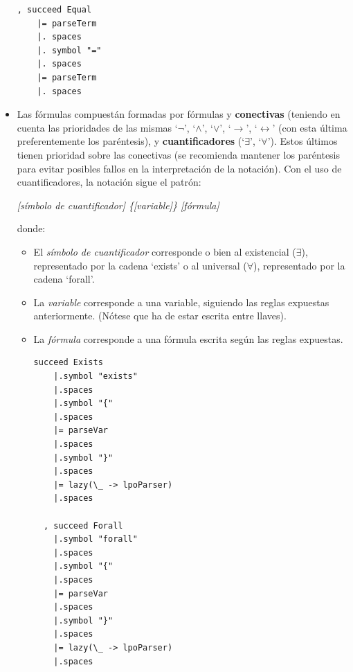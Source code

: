 \documentclass[a4paper]{report}
\begin{document}
\begin{itemize}
\begin{lstlisting}[caption={ParserLPO. Definición de Predicado de Igualdad.}, mathescape=true]
, succeed Equal
    |= parseTerm
    |. spaces
    |. symbol "="
    |. spaces
    |= parseTerm
    |. spaces 
\end{lstlisting}

\item Las fórmulas compuestán formadas por fórmulas y \textbf{conectivas} (teniendo en cuenta las prioridades de las mismas `$\neg$', `$\wedge$', `$\vee$', `$\rightarrow$', `$\leftrightarrow$' (con esta última preferentemente los paréntesis), y \textbf{cuantificadores} (`$\exists$', `$\forall$'). Estos últimos tienen prioridad sobre las conectivas (se recomienda mantener los paréntesis para evitar posibles fallos en la interpretación de la notación). Con el uso de cuantificadores, la notación sigue el patrón:

\begin{center}
\textit{[símbolo de cuantificador] \{[variable]\} [fórmula]}\\
\end{center}

donde:
\begin{itemize}
\item El \textit{símbolo de cuantificador} corresponde o bien al existencial ($\exists$), representado por la cadena `exists' o al universal ($\forall$), representado por la cadena `forall'.

\item La \textit{variable} corresponde a una variable, siguiendo las reglas expuestas anteriormente. (Nótese que ha de estar escrita entre llaves).

\item La \textit{fórmula} corresponde a una fórmula escrita según las reglas expuestas.\\

\begin{lstlisting}[caption={ParserLPO. Definición de Fórmulas con cuantificadores.}, mathescape=true]
succeed Exists
    |.symbol "exists"
    |.spaces
    |.symbol "{"
    |.spaces
    |= parseVar
    |.spaces
    |.symbol "}"
    |.spaces
    |= lazy(\_ -> lpoParser)
    |.spaces
  
  , succeed Forall
    |.symbol "forall"
    |.spaces
    |.symbol "{"
    |.spaces
    |= parseVar
    |.spaces
    |.symbol "}"
    |.spaces
    |= lazy(\_ -> lpoParser)
    |.spaces
\end{lstlisting}
\end{itemize}
\end{itemize}
\end{document}

